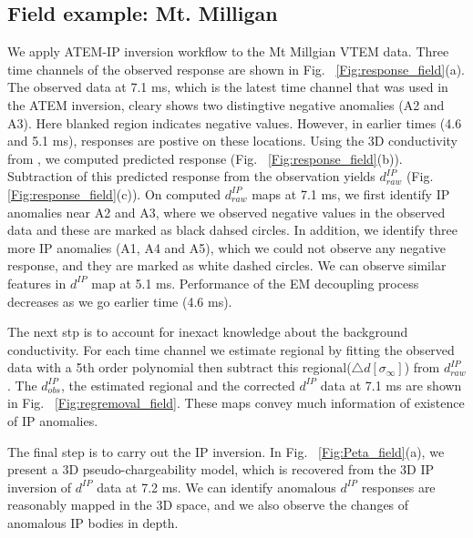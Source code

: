 \documentclass[letterpaper,11pt]{article}
\newcommand{\siginf}{\sigma_\infty}
\newcommand{\dip}{d^{IP}}
\begin{document}
\subsection{Field example: Mt. Milligan}
We apply ATEM-IP inversion workflow to the Mt Millgian VTEM data. Three time channels of the observed response are shown in Fig. ~\ref{Fig:response_field}(a). The observed data at 7.1 ms, which is the latest time channel that was used in the ATEM inversion, cleary shows two distingtive negative anomalies (A2 and A3). Here blanked region indicates negative values. However, in earlier times (4.6 and 5.1 ms), responses are postive on these locations. Using the 3D conductivity from \cite{yang20143}, we computed predicted response (Fig. ~\ref{Fig:response_field}(b)). Subtraction of this predicted response from the observation yields $\dip_{raw}$ (Fig. \ref{Fig:response_field}(c)). On computed $\dip_{raw}$ maps at 7.1 ms, we first identify IP anomalies near A2 and A3, where we observed negative values in the observed data and these are marked as black dahsed circles. In addition, we identify three more IP anomalies (A1, A4 and A5), which we could not observe any negative response, and they are marked as white dashed circles. We can observe similar features in $\dip$ map at 5.1 ms. Performance of the EM decoupling process decreases as we go earlier time (4.6 ms). 

The next stp is to account for inexact knowledge about the background conductivity. For each time channel we estimate regional by fitting the observed data with a 5th order polynomial then subtract this regional($\triangle d[\siginf]$) from $\dip_{raw}$. The $\dip_{obs}$, the estimated regional and the corrected $\dip$ data at 7.1 ms are shown in Fig. ~\ref{Fig:regremoval_field}. These maps convey much information of existence of IP anomalies. 

The final step is to carry out the IP inversion. In Fig. ~\ref{Fig:Peta_field}(a), we present a 3D pseudo-chargeability model, which is recovered from the 3D IP inversion of $\dip$ data at 7.2 ms.  We can identify anomalous $\dip$ responses are reasonably mapped in the 3D space, and we also observe the changes of anomalous IP bodies in depth. 
\end{document}
